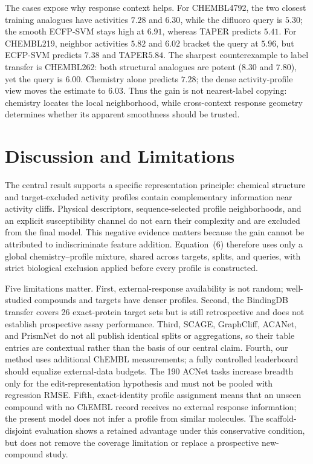 \documentclass[manuscript,nonacm]{acmart}
\newcommand{\method}{TAPER\xspace}
\begin{document}
The cases expose why response context helps. For CHEMBL4792, the two closest
training analogues have activities $7.28$ and $6.30$, while the difluoro query is
$5.30$; the smooth ECFP-SVM stays high at $6.91$, whereas \method predicts
$5.41$. For CHEMBL219, neighbor activities $5.82$ and $6.02$ bracket the query
at $5.96$, but ECFP-SVM predicts $7.38$ and \method $5.84$. The sharpest
counterexample to label transfer is CHEMBL262: both structural analogues are
potent ($8.30$ and $7.80$), yet the query is $6.00$. Chemistry alone predicts
$7.28$; the dense activity-profile view moves the estimate to $6.03$. Thus the
gain is not nearest-label copying: chemistry locates the local neighborhood,
while cross-context response geometry determines whether its apparent
smoothness should be trusted.

\FloatBarrier

\section{Discussion and Limitations}
The central result supports a specific representation principle: chemical
structure and target-excluded activity profiles contain complementary
information near activity cliffs. Physical descriptors, sequence-selected
profile neighborhoods, and an explicit susceptibility channel do not earn
their complexity and are excluded from the final model. This negative evidence
matters because the gain cannot be attributed to indiscriminate feature
addition. Equation~(6) therefore uses only a global chemistry--profile mixture,
shared across targets, splits, and queries, with strict biological exclusion
applied before every profile is constructed.

Five limitations matter. First, external-response availability is not random;
well-studied compounds and targets have denser profiles. Second, the BindingDB
transfer covers 26 exact-protein target sets but is still retrospective and
does not establish prospective assay performance. Third, SCAGE, GraphCliff, ACANet, and PrismNet do not all
publish identical splits or aggregations, so their table entries are contextual
rather than the basis of our central claim.
Fourth, our method uses additional ChEMBL measurements; a fully controlled
leaderboard should equalize external-data budgets. The 190 ACNet tasks increase
breadth only for the edit-representation hypothesis and must not be pooled with
regression RMSE. Fifth, exact-identity profile assignment means that an unseen
compound with no ChEMBL record receives no external response information; the
present model does not infer a profile from similar molecules. The
scaffold-disjoint evaluation shows a retained advantage under this conservative
condition, but does not remove the coverage limitation or replace a prospective
new-compound study.
\end{document}
